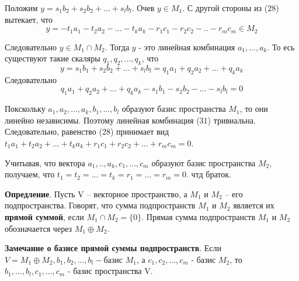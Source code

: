 \documentclass[a4paper]{article}
\begin{document}
\begin{hproof}
        Положим $y = s_1b_2 +s_2b_2 + ... + s_lb_l$. Очев $y \in M_1$. С другой стороны из (28) вытекает, что \begin{equation}
                                                                                                                  y = -t_1a_1 - t_2a_2 -... -t_ka_k - r_1c_1 -r_2c_2 -.. -r_mc_m \in M_2
        \end{equation}

        Следовательно $y \in M_1 \cap M_2$. Тогда $y$ - это линейная комбинация $a_1, ..., a_k$. То есь существуют такие скаляры $q_1, q_2, ..., q_k$, что
        \begin{equation}
            y = s_1b_1+s_2b_2+...+s_lb_l = q_1a_1 + q_2a_2 + ... + q_ka_k
        \end{equation}
        Следовательно
        \begin{equation}
            q_1a_1 + q_2a_2 + ... + q_ka_k - s_1b_1 - s_2b_2-... - s_lb_l = 0
        \end{equation}

        Покскольку $a_1, a_2, ..., a_k, b_1, ..., b_l$ образуют базис пространства $M_1$, то они линейно независимы. Поэтому линейная комбинация (31) тривиальна. Следовательно, равенство (28) принимает вид $t_1a_1 +t_2a_2 + ... + t_ka_k +r_1c_1 + r_2c_2 + ... + r_mc_m = 0$.

        Учитывая, что вектора $a_1, .., a_k, c_1, ..., c_m$ образуют базис пространства $M_2$, получаем, что $t_1 = t_2 = ... = t_k = r_1 = ... = r_m = 0$. чтд браток.
    \end{hproof}

    \newpage \begin{center}
                 \begin{Large}
                 \end{Large}
    \end{center}

    \textbf{Опредление}. Пусть V – векторное пространство, а $M_1$ и $M_2$ – его подпространства.
    Говорят, что сумма подпространств $M_1$ и $M_2$ является их \textbf{прямой суммой},
    если $M_1 \cap M_2 =\{ 0 \}$. Прямая сумма подпространств $M_1$ и $M_2$
    обозначается через $M_1 \oplus M_2$.

    \begin{htheorem}
        \textbf{Замечание о базисе прямой суммы подпространств}. Если $V = M_1 \oplus M_2, b_1, b_2, ..., b_l - $базис $M_1$, а $c_1, c_2, ..., c_m$ - базис $M_2$, то $b_1, ..., b_l, c_1, ..., c_m$ - базис пространства V.
    \end{htheorem}
\end{document}
